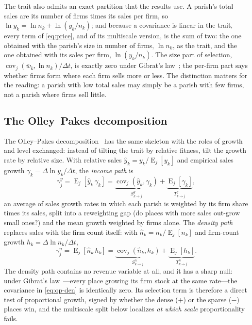 \documentclass[conference]{IEEEtran}
\newcommand{\Cov}{\operatorname{cov}}
\newcommand{\E}{\operatorname{E}}
\begin{document}
The trait also admits an exact partition that the results use. A parish's
total sales are its number of firms times its sales per firm, so
$\ln y_k = \ln n_k + \ln (y_k/n_k)$; and because a covariance is linear in
the trait, every term of \eqref{eq:price}, and of its multiscale version,
is the sum of two: the one obtained with the parish's size in number of
firms, $\ln n_k$, as the trait, and the one obtained with its sales per
firm, $\ln (y_k/n_k)$. The size part of selection,
$\Cov_j(\bar w_k, \ln n_k)/\Delta t$, is exactly zero under Gibrat's
law~\cite{gibrat1931}; the per-firm part says whether firms form where
each firm sells more or less. The distinction matters for the reading: a
parish with low total sales may simply be a parish with few firms, not a
parish where firms sell little.

\subsection{The Olley--Pakes decomposition}

The Olley--Pakes decomposition~\cite{olleypakes1996} has the same
skeleton with the roles of growth and level exchanged: instead of tilting
the trait by relative fitness, tilt the growth rate by relative size.
With relative sales $\hat y_k = y_k / \E_j[y_k]$ and empirical sales
growth $\gamma_k = \Delta \ln y_k / \Delta t$, the \textit{income path}
is
\begin{equation}
\gamma^{y}_j = \E_j[\hat y_k\, \gamma_k]
= \underbrace{\Cov_j(\hat y_k, \gamma_k)}_{S^{y}_{k\to j}}
+ \underbrace{\E_j[\gamma_k]}_{T^{y}_{k\to j}} ,
\label{eq:op-inc}
\end{equation}
an average of sales growth rates in which each parish is weighted by its
firm share times its sales, split into a reweighting gap (do places with
more sales out-grow small ones?) and the mean growth weighted by firms
alone. The \textit{density path} replaces sales with the
firm count itself: with $\hat n_k = n_k / \E_j[n_k]$ and firm-count
growth $h_k = \Delta \ln n_k / \Delta t$,
\begin{equation}
\gamma^{n}_j = \E_j[\hat n_k\, h_k]
= \underbrace{\Cov_j(\hat n_k, h_k)}_{S^{n}_{k\to j}}
+ \underbrace{\E_j[h_k]}_{T^{n}_{k\to j}} .
\label{eq:op-den}
\end{equation}
The density path contains no revenue variable at all, and it has a sharp
null: under Gibrat's law~\cite{gibrat1931}---every place growing its firm
stock at the same rate---the covariance in \eqref{eq:op-den} is
identically zero. Its selection term is therefore a direct test of
proportional growth, signed by whether the dense ($+$) or the sparse
($-$) places win, and the multiscale split below localizes \textit{at which
scale} proportionality fails.
\end{document}
